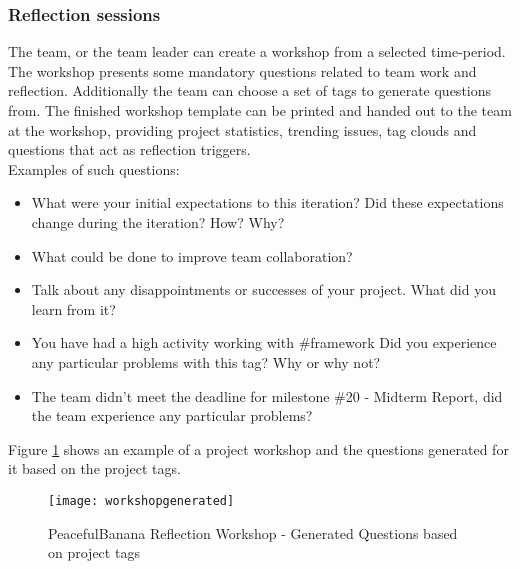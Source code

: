 \subsubsection{Reflection sessions}
The team, or the team leader can create a workshop from a selected time-period. The workshop presents some mandatory questions
related to team work and reflection. Additionally the team can choose a set of tags to generate questions from. The finished workshop template can be printed and handed out to the team at the workshop, providing project statistics, trending issues, tag clouds and questions that act as reflection triggers.\\
Examples of such questions: 
	\begin{itemize}
		\item What were your initial expectations to this iteration? Did these expectations change during the iteration? How? Why?
		\item What could be done to improve team collaboration?
		\item Talk about any disappointments or successes of your project. What did you learn from it?
		\item You have had a high activity working with \#framework Did you experience any particular problems with this tag? Why or why not?
		\item The team didn't meet the deadline for milestone \#20 - Midterm Report, did the team experience any particular problems?
	\end{itemize}
Figure \ref{workshopquestionspeaceful} shows an example of a project workshop and the questions generated for it based on the project tags. 
	\begin{figure}[!htpb]
		\centering
		\texttt{[image: workshopgenerated]}
		\caption{PeacefulBanana Reflection Workshop - Generated Questions based on project tags}
		\label{workshopquestionspeaceful}
	\end{figure}